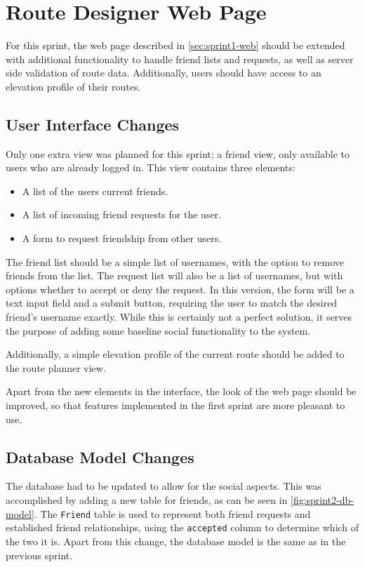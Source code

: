 \section{Route Designer Web Page}
\label{sec:sprint2-web}

For this sprint, the web page described in \autoref{sec:sprint1-web} should be extended with additional functionality to handle friend lists and requests, as well as server side validation of route data. Additionally, users should have access to an elevation profile of their routes.

\subsection{User Interface Changes}
Only one extra view was planned for this sprint; a friend view, only available to users who are already logged in. This view contains three elements:

\begin{itemize}
	\item{A list of the users current friends.}
	\item{A list of incoming friend requests for the user.}
	\item{A form to request friendship from other users.}
\end{itemize}

The friend list should be a simple list of usernames, with the option to remove friends from the list. The request list will also be a list of usernames, but with options whether to accept or deny the request. In this version, the form will be a text input field and a submit button, requiring the user to match the desired friend's username exactly. While this is certainly not a perfect solution, it serves the purpose of adding some baseline social functionality to the system.

Additionally, a simple elevation profile of the current route should be added to the route planner view.

Apart from the new elements in the interface, the look of the web page should be improved, so that features implemented in the first sprint are more pleasant to use.

\subsection{Database Model Changes}
The database had to be updated to allow for the social aspects. This was accomplished by adding a new table for friends, as can be seen in \autoref{fig:sprint2-db-model}. The \texttt{Friend} table is used to represent both friend requests and established friend relationships, using the \texttt{accepted} column to determine which of the two it is. Apart from this change, the database model is the same as in the previous sprint.

